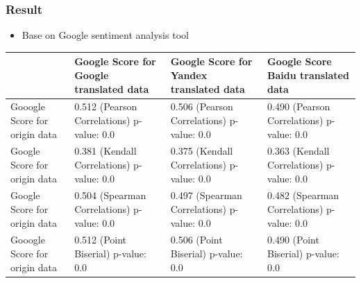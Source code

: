 \documentclass[conference,compsoc]{IEEEtran}
\begin{document}
\subsubsection{Result}
\label{sec:org938a23f}
\begin{itemize}
\item Base on Google sentiment analysis tool
\end{itemize}
\begin{center}
\begin{tabular}{llll}
 & Google Score for Google translated data & Google Score for Yandex translated data & Google Score Baidu translated data\\
\hline
Gooogle Score for origin data & 0.512 (Pearson Correlations)  p-value: 0.0 & 0.506 (Pearson Correlations) p-value: 0.0 & 0.490 (Pearson Correlations)  p-value: 0.0\\
Google Score for origin data & 0.381 (Kendall Correlations)  p-value: 0.0 & 0.375 (Kendall Correlations) p-value: 0.0 & 0.363 (Kendall Correlations) p-value: 0.0\\
Google Score for origin data & 0.504 (Spearman Correlations) p-value: 0.0 & 0.497 (Spearman Correlations) p-value: 0.0 & 0.482 (Spearman Correlations) p-value: 0.0\\
Gooogle Score for origin data & 0.512 (Point Biserial) p-value: 0.0 & 0.506 (Point Biserial) p-value: 0.0 & 0.490 (Point Biserial) p-value: 0.0\\
\end{tabular}
\end{center}
\end{document}
